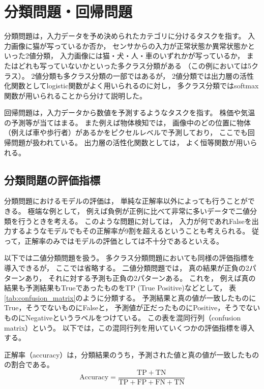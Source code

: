 \documentclass[class=jsarticle, crop=false, dvipdfmx, fleqn]{standalone}
\begin{document}
\section{分類問題・回帰問題}

分類問題は，入力データを予め決められたカテゴリに分けるタスクを指す。
入力画像に猫が写っているか否か，
センサからの入力が正常状態か異常状態かといった2値分類，
入力画像には猫・犬・人・車のいずれかが写っているか，
またはどれも写っていないかといった多クラス分類がある
（この例においては5クラス）。
2値分類も多クラス分類の一部ではあるが，
2値分類では出力層の活性化関数としてlogistic関数がよく用いられるのに対し，
多クラス分類ではsoftmax関数が用いられることから分けて説明した。

回帰問題は，入力データから数値を予測するようなタスクを指す。
株価や気温の予測等が当てはまる。
また例えば物体検知では，
画像中のどの位置に物体（例えば車や歩行者）があるかをピクセルレベルで予測しており，
ここでも回帰問題が扱われている。
出力層の活性化関数としては，
よく恒等関数が用いられる。


\subsection{分類問題の評価指標}

分類問題におけるモデルの評価は，
単純な正解率以外によっても行うことができる。
極端な例として，
例えば負例が正例に比べて非常に多いデータで二値分類を行うときを考える。
このような問題に対しては，
入力が何であれFalseを出力するようなモデルでもその正解率が9割を超えるということも考えられる。
従って，正解率のみではモデルの評価としては不十分であるといえる。

以下では二値分類問題を扱う。
多クラス分類問題においても同様の評価指標を導入できるが，
ここでは省略する。
二値分類問題では，
真の結果が正負の2パターンあり，
それに対する予測も正負の2パターンある。
これを，
例えば真の結果も予測結果もTrueであったものをTP (True Positive)などとして，
表\ref{tab:confusion_matrix}のように分類する。
予測結果と真の値が一致したものにTrue，そうでないものにFalseと，
予測値が正だったものにPositive，そうでないものにNegativeというラベルをつけている。
この表を混同行列（confusion matrix）という。
以下では，この混同行列を用いていくつかの評価指標を導入する。

正解率（accuracy）は，分類結果のうち，予測された値と真の値が一致したものの割合である。
\begin{equation}
\text{Accuracy} = \frac{\mathrm{TP + TN}}{\mathrm{TP + FP + FN + TN}}
\end{equation}
\end{document}
